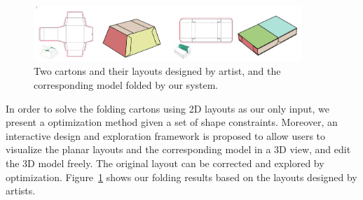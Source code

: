 \begin{figure}
	\centering
	\includegraphics[width=0.9\textwidth]{images/artist}
	\caption{Two cartons and their layouts designed by artist, and the corresponding model folded by our system.}
	\label{fig:artist}
\end{figure}




%
 
 
In order to solve the folding cartons using 2D layouts as our only input, we present a optimization method given a set of shape constraints.
Moreover, an interactive design and exploration framework is proposed to allow users to visualize the planar layouts and the corresponding model in a 3D view, and edit the 3D model freely. The original layout can be corrected and explored by optimization. Figure~\ref{fig:artist} shows our folding results based on the layouts designed by artists. 

